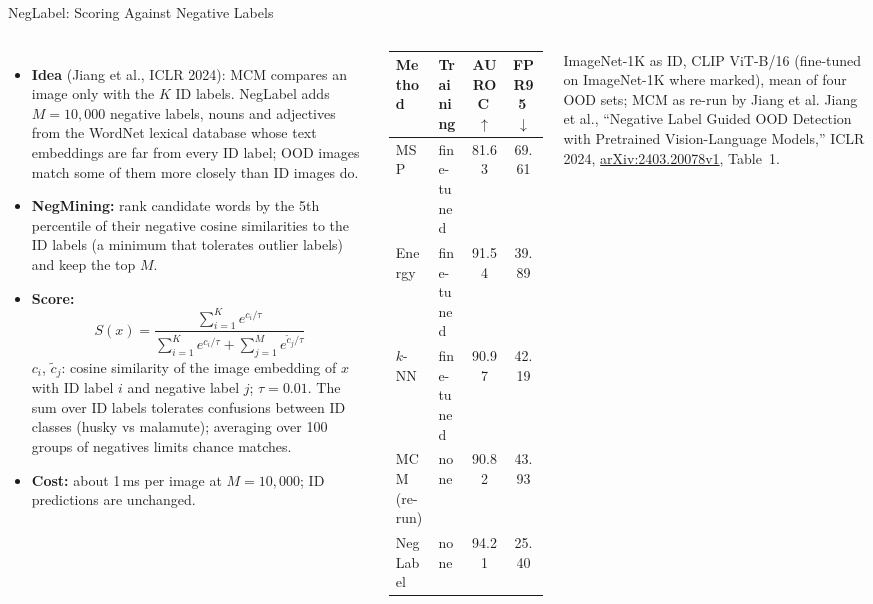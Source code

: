 \begin{frame}{NegLabel: Scoring Against Negative Labels}
  \begin{columns}[T,onlytextwidth]
      \begin{itemize}\scriptsize\itemsep0.3em
        \item \textbf{Idea} (Jiang et al., ICLR 2024): MCM compares an image only with the $K$ ID labels. NegLabel adds $M = 10{,}000$ negative labels, nouns and adjectives from the WordNet lexical database whose text embeddings are far from every ID label; OOD images match some of them more closely than ID images do.
        \item \textbf{NegMining:} rank candidate words by the 5th percentile of their negative cosine similarities to the ID labels (a minimum that tolerates outlier labels) and keep the top $M$.
        \item \textbf{Score:}
          \[ S(x) = \frac{\sum_{i=1}^{K} e^{c_i/\tau}}{\sum_{i=1}^{K} e^{c_i/\tau} + \sum_{j=1}^{M} e^{\tilde{c}_j/\tau}} \]
          $c_i$, $\tilde{c}_j$: cosine similarity of the image embedding of $x$ with ID label $i$ and negative label $j$; $\tau = 0.01$. The sum over ID labels tolerates confusions between ID classes (husky vs malamute); averaging over 100 groups of negatives limits chance matches.
        \item \textbf{Cost:} about 1\,ms per image at $M = 10{,}000$; ID predictions are unchanged.
      \end{itemize}
      \centering
      {\scriptsize
      \setlength{\tabcolsep}{4pt}
      \begin{tabular}{llcc}
        \toprule
        \textbf{Method} & \textbf{Training} & \textbf{AUROC}\,$\uparrow$ & \textbf{FPR95}\,$\downarrow$ \\
        \midrule
        MSP & fine-tuned & 81.63 & 69.61 \\
        Energy & fine-tuned & 91.54 & 39.89 \\
        $k$-NN & fine-tuned & 90.97 & 42.19 \\
        \addlinespace[0.15em]
        MCM (re-run) & none & 90.82 & 43.93 \\
        NegLabel & none & 94.21 & 25.40 \\
        \bottomrule
      \end{tabular}\par}
      \vspace{0.2em}
      {\scriptsize ImageNet-1K as ID, CLIP ViT-B/16 (fine-tuned on ImageNet-1K where marked), mean of four OOD sets; MCM as re-run by Jiang et al. Jiang et al., ``Negative Label Guided OOD Detection with Pretrained Vision-Language Models,'' ICLR 2024, \href{https://arxiv.org/abs/2403.20078v1}{arXiv:2403.20078v1}, Table~1.\par}

\end{columns}
\end{frame}
